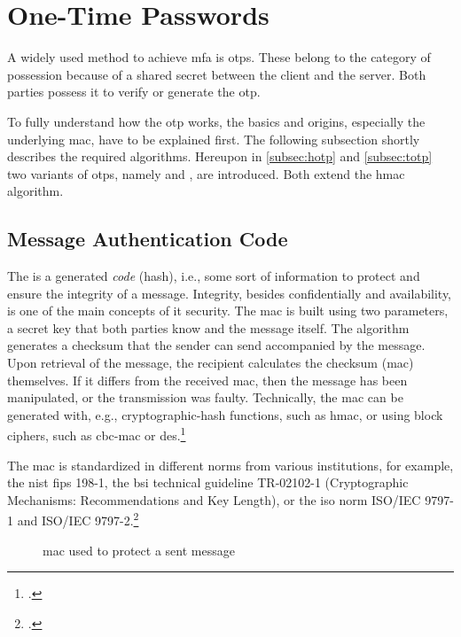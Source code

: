 \section{One-Time Passwords}

A widely used method to achieve \gls{mfa} is \glspl{otp}. These belong to the category of possession because of a shared secret between the client and the server. Both parties possess it to verify or generate the \gls{otp}.

To fully understand how the \gls{otp} works, the basics and origins, especially the underlying \gls{mac}, have to be explained first. The following subsection shortly describes the required algorithms. Hereupon in \autoref{subsec:hotp} and \autoref{subsec:totp} two variants of \glspl{otp}, namely  and , are introduced. Both extend the \gls{hmac} algorithm.

\subsection{Message Authentication Code}

The  is a generated \textit{code} (hash), i.e., some sort of information to protect and ensure the integrity of a message. Integrity, besides confidentially and availability, is one of the main concepts of \gls{it} security. The \gls{mac} is built using two parameters, a secret key that both parties know and the message itself. The algorithm generates a checksum that the sender can send accompanied by the message. Upon retrieval of the message, the recipient calculates the checksum (\gls{mac}) themselves. If it differs from the received \gls{mac}, then the message has been manipulated, or the transmission was faulty. Technically, the \gls{mac} can be generated with, e.g., cryptographic-hash functions, such as \gls{hmac}, or using block ciphers, such as \gls{cbc-mac} or \gls{des}.\footcites[See][565]{doi:10.1002/9781118256107}[See][163--168]{anderson2008security}[See][391--393]{eckert-it-sec-9}

The \gls{mac} is standardized in different norms from various institutions, for example, the \gls{nist} \gls{fips} 198-1, the \gls{bsi} technical guideline TR-02102-1 (\frqq Cryptographic Mechanisms: Recommendations and Key Length\flqq{}), or the \gls{iso} norm ISO/IEC 9797-1 and ISO/IEC 9797-2.\footcites[See][]{FIPS198}[See][]{bsi2019recommendations}[See][]{iso9797-1}[See][]{iso9797-2}
 \\
\begin{figure}[hbt]
	\centering
	
	\caption[\Glsdesc{mac} used to protect a sent message]{\Glsdesc{mac} used to protect a sent message\footnotemark}
	\label{fig:mac}
\end{figure}

